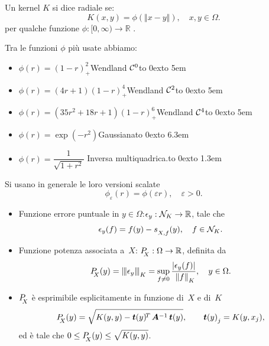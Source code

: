 \documentclass[10pt]{beamer}
\theoremstyle{definition}
\theoremstyle{plain}
\def\R{\mathbb R}
\def\Cal#1{{\cal #1}}
\def\norm#1{\Vert #1\Vert}
\def\opnorm#1{|\mskip-1.5mu|\mskip-1.5mu|#1|\mskip-1.5mu|\mskip-1.5mu|}
\def\hbyw#1#2{\vbox to #1{\vfil \hbox to #2{\hfil}}}
\def\lK{{\lower.5ex\hbox{$\scriptstyle K$}}}
\def\lX{{\!\!\lower.5ex\hbox{$\scriptstyle X$}}}
\def\lXf{{\lower.5ex\hbox{$\scriptstyle X, f$}}}
\begin{document}
\begin{frame}
Un kernel $K$ si dice \alert{radiale} se:
$$
K(x, y) = \phi(\norm{x - y}), \quad x,y\in\Omega.
$$
per qualche funzione  $\phi:[0,\infty)\to\R$ .

\medskip

Tra le funzioni $\phi$ più usate abbiamo:
\begin{itemize}
\item $\phi(r) =  (1- r)_+^2$\hfill Wendland $\Cal C^0$\hbyw{0ex}{5em}
\item $\phi(r) = (4r+1)(1- r)^4_+$\hfill Wendland $\Cal C^2$\hbyw{0ex}{5em}
\item $\phi(r) = (35r^2 +18r+1)(1- r)^6_+$\hfill Wendland $\Cal C^4$\hbyw{0ex}{5em}

\bigskip

\item $\phi(r) = \exp(-r^2)$\hfill Gaussiana\hbyw{0ex}{6.3em}
\item $\phi(r) = \dfrac1{\sqrt{1+r^2}}$ \hfill Inversa multiquadrica.\hbyw{0ex}{1.3em}
\end{itemize}

\bigskip

Si usano in generale le loro versioni scalate
$$
\phi_\varepsilon(r) = \phi(\varepsilon r), \quad \varepsilon>0.
$$

\end{frame}





\begin{frame}
\begin{itemize}
\item
Funzione \alert{errore puntuale} in $y\in\Omega$:\quad $\epsilon_y:\Cal N_K\to\R$, tale che 
$$
\epsilon_y(f) = f(y)-s_\lXf(y),\quad f\in\Cal N_K.
$$

\item
Funzione \alert{potenza} associata a~$X$: \quad $P_{\lX}:\Omega\to\R$, definita da
$$
P_\lX(y) = \opnorm{\epsilon_y}_\lK = \sup_{f\neq 0} \frac{|\epsilon_y(f)|}{\,\,\norm f_\lK}, \quad y\in\Omega.
$$

\item 
$P_\lX$ è esprimibile esplicitamente in funzione di~$X$ e di~$K$
$$
P_\lX(y) = \sqrt{K(y,y)-\bm t(y)^{\!T\,}\bm A^{-1}\, \bm t(y)},\qquad \bm t(y)_{\lower.4ex\hbox{$\scriptstyle j$}} = K(y, x_j),
$$
ed è tale che $0\leq P_\lX(y)\leq\sqrt{\hbyw{1.92ex}{0em}K(y,y)}$.

\end{itemize}


\end{frame}
\end{document}
